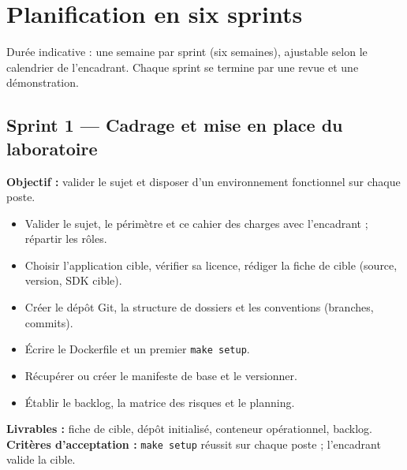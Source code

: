 \documentclass[11pt,a4paper]{article}
\newcommand{\code}[1]{{\NoAutoSpacing\texttt{\small #1}}}
\newcommand{\code}[1]{{\texttt{\small #1}}}
\begin{document}
\section{Planification en six sprints}
Durée indicative : une semaine par sprint (six semaines), ajustable selon le calendrier de l'encadrant. Chaque sprint se termine par une revue et une démonstration.

\subsection{Sprint 1 --- Cadrage et mise en place du laboratoire}
\textbf{Objectif :} valider le sujet et disposer d'un environnement fonctionnel sur chaque poste.
\begin{itemize}
  \item Valider le sujet, le périmètre et ce cahier des charges avec l'encadrant ; répartir les rôles.
  \item Choisir l'application cible, vérifier sa licence, rédiger la fiche de cible (source, version, SDK cible).
  \item Créer le dépôt Git, la structure de dossiers et les conventions (branches, commits).
  \item Écrire le Dockerfile et un premier \code{make setup}.
  \item Récupérer ou créer le manifeste de base et le versionner.
  \item Établir le backlog, la matrice des risques et le planning.
\end{itemize}
\textbf{Livrables :} fiche de cible, dépôt initialisé, conteneur opérationnel, backlog.\\
\textbf{Critères d'acceptation :} \code{make setup} réussit sur chaque poste ; l'encadrant valide la cible.
\end{document}
